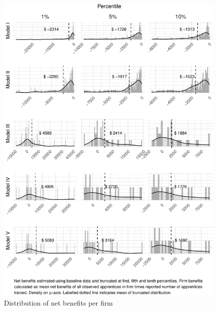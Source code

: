 \documentclass[
  11pt,
a4paper
]{article}
\begin{document}
\begin{figure}
\includegraphics[width=1\linewidth,]{figures/fig-firmhist-1} \caption{Distribution of net benefits per firm}\label{fig:fig-firmhist}
\end{figure}
\end{document}
